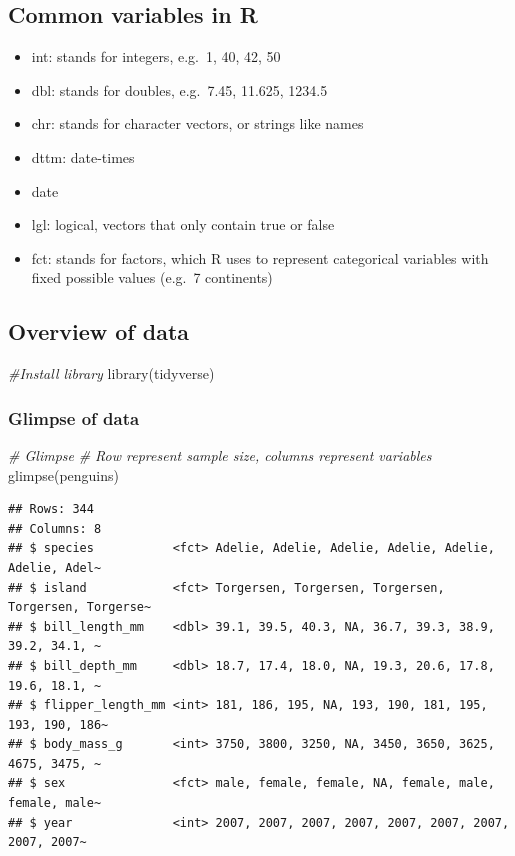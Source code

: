 \documentclass[
]{article}
\newenvironment{Shaded}{\begin{snugshade}}{\end{snugshade}}
\newcommand{\CommentTok}[1]{\textcolor[rgb]{0.56,0.35,0.01}{\textit{#1}}}
\newcommand{\FunctionTok}[1]{\textcolor[rgb]{0.00,0.00,0.00}{#1}}
\newcommand{\NormalTok}[1]{#1}
\providecommand{\tightlist}{%
  \setlength{\itemsep}{0pt}\setlength{\parskip}{0pt}}
\begin{document}
\hypertarget{common-variables-in-r}{%
\subsection{Common variables in R}\label{common-variables-in-r}}

\begin{itemize}
\tightlist
\item
  int: stands for integers, e.g.~1, 40, 42, 50
\item
  dbl: stands for doubles, e.g.~7.45, 11.625, 1234.5
\item
  chr: stands for character vectors, or strings like names
\item
  dttm: date-times
\item
  date
\item
  lgl: logical, vectors that only contain true or false
\item
  fct: stands for factors, which R uses to represent categorical
  variables with fixed possible values (e.g.~7 continents)
\end{itemize}

\hypertarget{overview-of-data}{%
\subsection{Overview of data}\label{overview-of-data}}

\begin{Shaded}
\begin{Highlighting}[]
\CommentTok{\#Install library}
\FunctionTok{library}\NormalTok{(tidyverse)}
\end{Highlighting}
\end{Shaded}

\hypertarget{glimpse-of-data}{%
\subsubsection{Glimpse of data}\label{glimpse-of-data}}

\begin{Shaded}
\begin{Highlighting}[]
\CommentTok{\# Glimpse}
\CommentTok{\# Row represent sample size, columns represent variables}
\FunctionTok{glimpse}\NormalTok{(penguins)}
\end{Highlighting}
\end{Shaded}

\begin{verbatim}
## Rows: 344
## Columns: 8
## $ species           <fct> Adelie, Adelie, Adelie, Adelie, Adelie, Adelie, Adel~
## $ island            <fct> Torgersen, Torgersen, Torgersen, Torgersen, Torgerse~
## $ bill_length_mm    <dbl> 39.1, 39.5, 40.3, NA, 36.7, 39.3, 38.9, 39.2, 34.1, ~
## $ bill_depth_mm     <dbl> 18.7, 17.4, 18.0, NA, 19.3, 20.6, 17.8, 19.6, 18.1, ~
## $ flipper_length_mm <int> 181, 186, 195, NA, 193, 190, 181, 195, 193, 190, 186~
## $ body_mass_g       <int> 3750, 3800, 3250, NA, 3450, 3650, 3625, 4675, 3475, ~
## $ sex               <fct> male, female, female, NA, female, male, female, male~
## $ year              <int> 2007, 2007, 2007, 2007, 2007, 2007, 2007, 2007, 2007~
\end{verbatim}
\end{document}
